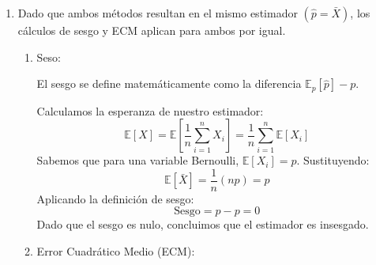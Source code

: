 \begin{enumerate}[label=\color{red}\textbf{\arabic*)}]
\begin{enumerate}[label=\color{red}\textbf{\alph*)}]
\begin{enumerate}[label=\arabic*)]
			                  Para una muestra de variables Bernoulli donde $f_X(x_i;p)=p^{x_i}(1-p)^{1-x_i}$, la función de verosimilitud es: \[
				                  L_n(p)=\prod_{i=1}^{n} p^{x_i}(1-p)^{1-x_i}=p^{\sum x_i}(1-p)^{n-\sum x_i}
			                  \]
			                  Para encontrar el máximo, aplicamos el logaritmo (que simplifica el producto) y derivamos con respecto a $p$: \[
				                  \ln L_n(p)=\left( \sum_{i=1}^{n} x_i \right) \ln p+\left( n- \sum_{i=1}^{n} x_i \right) \ln(1-p)
			                  \]
			                  Derivamos e igualamos a 0:
			                  \[
				                  \begin{aligned}
					                  \frac{\partial }{\partial p} \ln L_n(p)=\dfrac{\sum x_i}{p}- \dfrac{n-\sum x_i}{1-p}=0 & \implies \dfrac{\sum x_i}{p}=\dfrac{n-\sum x_i}{1-p} \implies (1-p) \sum_{i=1}^{n} x_i=p \left( n- \sum_{i=1}^{n} x_i \right) \\
					                                                                                                         & \implies \sum_{i=1}^{n} x_i -p\sum_{i=1}^{n} x_i=pn - p\sum_{i=1}^{n}x_i                                                      \\
					                                                                                                         & \implies pn = \sum_{i=1}^{n} x_i
				                  \end{aligned}
			                  \]
			                  Depesjando $p$, obtenemos el estimador: \[
				                  \hat{p}_{EMV}=\dfrac{1}{n} \sum_{i=1}^{n} x_i=\bar{X}
			                  \]
		            \end{enumerate}
		      \item {}

		            Dado que ambos métodos resultan en el mismo estimador $(\hat{p}=\bar{X})$, los cálculos de sesgo y ECM aplican para ambos por igual.
		            \begin{enumerate}[label=\arabic*)]
			            \item Seso:

			                  El sesgo se define matemáticamente como la diferencia $\mathbb{E}_p[\hat{p}]-p$.

			                  Calculamos la esperanza de nuestro estimador: \[
				                  \mathbb{E}[X]=\mathbb{E}\left[ \dfrac{1}{n} \sum_{i=1}^{n} X_i \right] =\dfrac{1}{n} \sum_{i=1}^{n} \mathbb{E}[X_i]
			                  \]
			                  Sabemos que para una variable Bernoulli, $\mathbb{E}[X_i]=p$. Sustituyendo: \[
				                  \mathbb{E}[\bar{X}]=\dfrac{1}{n}(np)=p
			                  \]
			                  Aplicando la definición de sesgo: \[
				                  \mathrm{Sesgo}=p-p=0
			                  \]
			                  Dado que el sesgo es nulo, concluimos que el estimador es insesgado.
			            \item Error Cuadrático Medio (ECM):


\end{enumerate}
\end{enumerate}
\end{enumerate}

